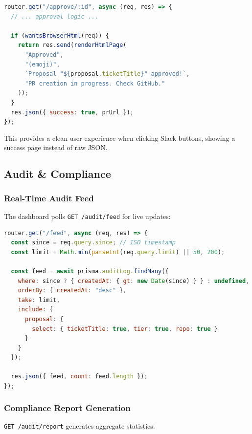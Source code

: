 \documentclass[11pt,a4paper]{article}
\begin{document}
\begin{lstlisting}[language=JavaScript,caption=HTML Response for Browser Clicks]
router.get("/approve/:id", async (req, res) => {
  // ... approval logic ...
  
  if (wantsBrowserHtml(req)) {
    return res.send(renderHtmlPage(
      "Approved",
      "(emoji)",
      `Proposal "${proposal.ticketTitle}" approved!`,
      "PR creation in progress. Check GitHub."
    ));
  }
  res.json({ success: true, prUrl });
});
\end{lstlisting}

This provides a clean user experience when clicking Slack buttons, showing a success page instead of raw JSON.

\subsection{Audit \& Compliance}

\subsubsection{Real-Time Audit Feed}
The dashboard polls \texttt{GET /audit/feed} for live updates:

\begin{lstlisting}[language=JavaScript,caption=Audit Feed (audit.ts)]
router.get("/feed", async (req, res) => {
  const since = req.query.since; // ISO timestamp
  const limit = Math.min(parseInt(req.query.limit) || 50, 200);
  
  const feed = await prisma.auditLog.findMany({
    where: since ? { createdAt: { gt: new Date(since) } } : undefined,
    orderBy: { createdAt: "desc" },
    take: limit,
    include: {
      proposal: {
        select: { ticketTitle: true, tier: true, repo: true }
      }
    }
  });
  
  res.json({ feed, count: feed.length });
});
\end{lstlisting}

\newpage
\subsubsection{Compliance Report Generation}
\texttt{GET /audit/report} generates aggregate statistics:
\end{document}
